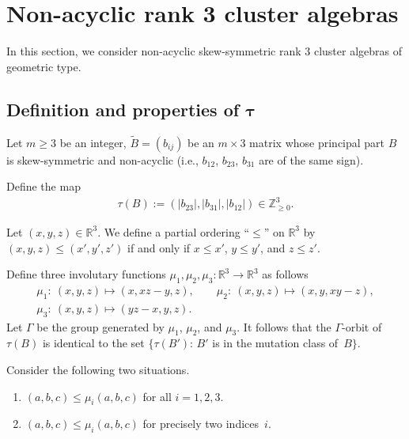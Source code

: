 \section{Non-acyclic rank 3 cluster algebras}\label{section4}
In this section, we consider non-acyclic skew-symmetric rank 3 cluster algebras of geometric type.

\subsection[Def\/inition and properties of $\tau$]{Def\/inition and properties of $\boldsymbol{\tau}$}\label{section4.1}

Let  $m\geq 3$ be an integer, $\tilde{B}=(b_{ij})$ be an $m \times 3$ matrix whose principal part $B$ is skew-symmetric and non-acyclic (i.e., $b_{12}$, $b_{23}$, $b_{31}$ are of the same sign).

Def\/ine the map
\begin{gather*}
\tau(B):=(|b_{23}|,|b_{31}|,|b_{12}|)\in \mathbb{Z}^3_{\geq 0}.
\end{gather*}

\begin{Definition}
 Let $(x,y,z) \in \mathbb{R}^3$. We def\/ine a partial ordering ``$\le$'' on  $\mathbb{R}^3$ by $(x,y,z) \leq (x',y',z')$ if and only if $x \leq x'$, $y \leq y'$, and $z \leq z'$.
\end{Definition}

Def\/ine three involutary functions $\mu_1,\mu_2,\mu_3\colon \mathbb{R}^3\to\mathbb{R}^3$ as follows
\begin{gather*}
\mu_1\colon \ (x,y,z)\mapsto (x,xz-y,z), \qquad \mu_2\colon \ (x,y,z) \mapsto  (x,y,xy-z),
\\
\mu_3\colon \  (x,y,z) \mapsto(yz-x,y,z).
\end{gather*}
Let $\Gamma$ be the group generated by $\mu_1$, $\mu_2$, and $\mu_3$.  It follows that the $\Gamma$-orbit of $\tau(B)$ is identical to the set $\{\tau(B')$: $B'$ is in the mutation class of~$B \}$.

 Consider the following two situations.
\begin{enumerate}\itemsep=0pt
\item[(M1)] $(a,b,c)\leq \mu_i(a,b,c)$ for all $i=1,2,3$.
\item[(M2)] $(a,b,c)\leq \mu_i(a,b,c)$ for precisely two indices~$i$.
\end{enumerate}

